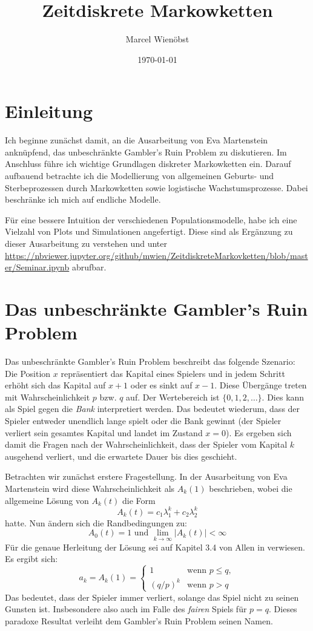 \documentclass{article}
\author{Marcel Wienöbst}
\date{\today}
\title{Zeitdiskrete Markowketten}
\begin{document}
\maketitle

\section{Einleitung}
Ich beginne zunächst damit, an die Ausarbeitung von Eva Martenstein \cite{eva}
anknüpfend, das unbeschränkte Gambler's Ruin Problem zu diskutieren. Im Anschluss führe ich wichtige Grundlagen diskreter Markowketten ein. Darauf aufbauend betrachte ich die Modellierung von allgemeinen Geburts- und Sterbeprozessen durch Markowketten sowie logistische Wachstumsprozesse. Dabei beschränke ich mich auf endliche Modelle.

Für eine bessere Intuition der verschiedenen Populationsmodelle, habe ich eine Vielzahl von Plots und Simulationen angefertigt. Diese sind als Ergänzung zu dieser Ausarbeitung zu verstehen und unter \href{https://nbviewer.jupyter.org/github/mwien/ZeitdiskreteMarkovketten/blob/master/Seminar.ipynb}{https://nbviewer.jupyter.org/github/mwien/ZeitdiskreteMarkovketten/blob/master/Seminar.ipynb} abrufbar.
\section{Das unbeschränkte Gambler's Ruin Problem}
Das unbeschränkte Gambler's Ruin Problem beschreibt das folgende Szenario:
Die Position $x$ repräsentiert das Kapital eines Spielers und in jedem Schritt erhöht sich das Kapital auf $x+1$ oder es sinkt auf $x-1$. Diese Übergänge treten mit Wahrscheinlichkeit $p$ bzw{.} $q$ auf. Der Wertebereich ist $\{0,1,2,\dots\}$. Dies kann als Spiel gegen die \emph{Bank} interpretiert werden. Das bedeutet wiederum, dass der Spieler entweder unendlich lange spielt oder die Bank gewinnt (der Spieler verliert sein gesamtes Kapital und landet im Zustand $x = 0$). Es ergeben sich damit die Fragen nach der Wahrscheinlichkeit, dass der Spieler vom Kapital $k$ ausgehend verliert, und die erwartete Dauer bis dies geschieht.

Betrachten wir zunächst erstere Fragestellung. In der Ausarbeitung von Eva Martenstein \cite{eva} wird diese Wahrscheinlichkeit als $A_k(1)$ beschrieben, wobei die allgemeine Lösung von $A_k(t)$ die Form
\[
  A_k(t) = c_1λ_1^k + c_2λ_2^k
\]
hatte. Nun ändern sich die Randbedingungen zu:
\[
  A_0(t) = 1 \text{ und } \lim_{k→∞}|A_k(t)| < ∞
\]
Für die genaue Herleitung der Lösung sei auf Kapitel 3.4 von Allen in \cite{allen} verwiesen. Es ergibt sich:
\[
  a_k = A_k(1) =
  \begin{cases}
    1 &\text{wenn } p \leq q, \\
    (q/p)^k &\text{wenn } p > q
  \end{cases}
\]
Das bedeutet, dass der Spieler immer verliert, solange das Spiel nicht zu seinen Gunsten ist. Insbesondere also auch im Falle des \emph{fairen} Spiels für $p = q$. Dieses paradoxe Resultat verleiht dem Gambler's Ruin Problem seinen Namen.
\end{document}
